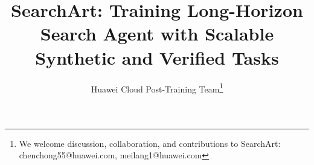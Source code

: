 \documentclass{huawei}
\begin{document}

\title{
SearchArt: Training Long-Horizon Search Agent with Scalable Synthetic and Verified Tasks
\vspace{-3mm}
}

%


\author{
Huawei Cloud Post-Training Team\footnote{We welcome discussion, collaboration, and contributions to SearchArt: chenchong55@huawei.com, meilang1@huawei.com}
\vspace{-5mm}
}







\end{document}
